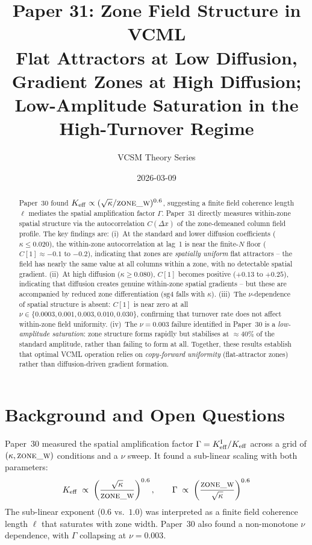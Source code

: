 \documentclass[11pt,a4paper]{article}
\title{\textbf{Paper 31: Zone Field Structure in VCML}\\
\large Flat Attractors at Low Diffusion, Gradient Zones at High Diffusion;\\
Low-Amplitude Saturation in the High-Turnover Regime}
\author{VCSM Theory Series}
\date{2026-03-09}
\begin{document}
\maketitle

\begin{abstract}
Paper~30 found $K_{\rm eff} \propto (\sqrt{\kappa}/\textsc{zone\_w})^{0.6}$, suggesting a
finite field coherence length $\ell$ mediates the spatial amplification factor $\Gamma$.
Paper~31 directly measures within-zone spatial structure via the autocorrelation
$C(\Delta x)$ of the zone-demeaned column field profile.  The key findings are:
(i)~At the standard and lower diffusion coefficients ($\kappa \leq 0.020$), the within-zone
autocorrelation at lag~1 is near the finite-$N$ floor ($C[1]\approx -0.1$ to $-0.2$),
indicating that zones are \emph{spatially uniform} flat attractors -- the field has nearly
the same value at all columns within a zone, with no detectable spatial gradient.
(ii)~At high diffusion ($\kappa \geq 0.080$), $C[1]$ becomes positive ($+0.13$ to $+0.25$),
indicating that diffusion creates genuine within-zone spatial gradients -- but these are
accompanied by reduced zone differentiation ($\mathrm{sg4}$ falls with $\kappa$).
(iii)~The $\nu$-dependence of spatial structure is absent: $C[1]$ is near zero at all
$\nu \in \{0.0003, 0.001, 0.003, 0.010, 0.030\}$, confirming that turnover rate does not
affect within-zone field uniformity.
(iv)~The $\nu=0.003$ failure identified in Paper~30 is a \emph{low-amplitude saturation}:
zone structure forms rapidly but stabilises at $\approx 40\%$ of the standard amplitude,
rather than failing to form at all.  Together, these results establish that optimal VCML
operation relies on \emph{copy-forward uniformity} (flat-attractor zones) rather than
diffusion-driven gradient formation.
\end{abstract}

\section{Background and Open Questions}
\label{sec:background}

Paper~30 measured the spatial amplification factor $\Gamma = K_{\rm eff}^{\rm I}/K_{\rm eff}$
across a grid of $(\kappa, \textsc{zone\_w})$ conditions and a $\nu$ sweep.  It found a
sub-linear scaling with both parameters:
\begin{equation}
K_{\rm eff} \;\propto\; \left(\frac{\sqrt{\kappa}}{\textsc{zone\_w}}\right)^{0.6},
\qquad
\Gamma \;\propto\; \left(\frac{\textsc{zone\_w}}{\sqrt{\kappa}}\right)^{0.6}
\label{eq:paper30}
\end{equation}
The sub-linear exponent ($0.6$ vs.\ $1.0$) was interpreted as a finite field coherence
length $\ell$ that saturates with zone width.  Paper~30 also found a non-monotone $\nu$
dependence, with $\Gamma$ collapsing at $\nu=0.003$.
\end{document}
